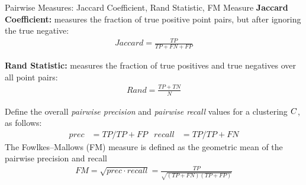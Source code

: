 \begin{frame}{Pairwise Measures: Jaccard Coeff\/{i}cient, Rand
  Statistic, FM Measure}
\small
{\bf Jaccard Coeff\/{i}cient:} measures the fraction of true positive point pairs,
but after ignoring the true negative:
\begin{align*}
\mathit{Jaccard} = \frac{\mathit{TP}}{\mathit{TP} + \mathit{FN} + \mathit{FP}}
\end{align*}

\medskip
{\bf Rand Statistic:} 
measures the fraction of true positives and true negatives over
all point pairs:
\begin{align*}
\mathit{Rand} = \frac{\mathit{TP} + \mathit{TN}}{N}
\end{align*}


Def\/{i}ne the overall
{\em pairwise
precision} and
{\em pairwise recall} values for a clustering ${\relax C}$, as follows:
\begin{align*}
  \mathit{prec} & = \mathit{TP}/\mathit{TP}+\mathit{FP} &
  \mathit{recall} & = \mathit{TP}/\mathit{TP}+\mathit{FN}
\end{align*}
The Fowlkes--Mallows (FM) measure is def\/{i}ned as the
geometric mean of the pairwise precision and recall
\begin{align*}
\mathit{FM} = \sqrt{\mathit{prec}\cdot \mathit{recall}} = \frac{\mathit{TP}}{\sqrt{ (\mathit{TP}+\mathit{FN})(\mathit{TP}+\mathit{FP}) }}
\end{align*}
\end{frame}


